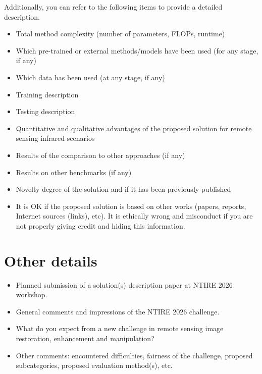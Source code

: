 \documentclass[10pt,twocolumn,letterpaper]{article}
\begin{document}
Additionally, you can refer to the following items to provide a detailed description.
\begin{itemize}
\item Total method complexity (number of parameters, FLOPs, runtime)
\item Which pre-trained or external methods/models have been used (for any stage, if any) 
\item Which data has been used (at any stage, if any) 
\item Training description
\item Testing description
\item Quantitative and qualitative advantages of the proposed solution for remote sensing infrared scenarios
\item Results of the comparison to other approaches (if any)
\item Results on other benchmarks (if any)
\item Novelty degree of the solution and if it has been previously published
\item It is OK if the proposed solution is based on other works (papers, reports, Internet sources (links), etc). It is ethically wrong and misconduct if you are not properly giving credit and hiding this information.
\end{itemize}

\section{Other details}
\begin{itemize}
\item Planned submission of a solution(s) description paper at NTIRE 2026 workshop. %
\item General comments and impressions of the NTIRE 2026 challenge. %
\item What do you expect from a new challenge in remote sensing image restoration, enhancement and manipulation? %
\item Other comments: encountered difficulties, fairness of the challenge, proposed subcategories, proposed evaluation method(s), etc.
\end{itemize}

{\small


}
\end{document}
